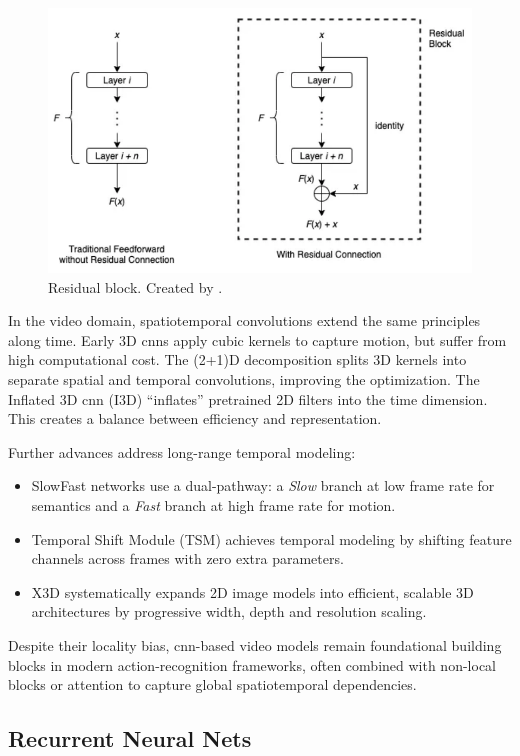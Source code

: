 \begin{figure}
    \centering
    \includegraphics[width=0.5\linewidth]{figures/res_connection.png} 
    \caption{Residual block. Created by \textcite{wong_what_is_residual_2022}. }
    \label{fig:res_connection}
\end{figure}

In the video domain, spatiotemporal convolutions extend the same principles along time.  Early 3D \acrshort{cnn}s \cite{tran_learning_2015} apply cubic kernels to capture motion, but suffer from high computational cost.  The (2+1)D decomposition \cite{tran_2_plus_1_convolution} splits 3D kernels into separate spatial and temporal convolutions, improving the optimization.  The Inflated 3D \acrshort{cnn} (I3D) \cite{carreira_2017_i3d_quo_vadis} “inflates” pretrained 2D filters into the time dimension. This creates a balance between efficiency and representation.

Further advances address long-range temporal modeling:
\begin{itemize}
    \item SlowFast networks \cite{feichtenhofer_slowfast_2019} use a dual-pathway: a \emph{Slow} branch at low frame rate for semantics and a \emph{Fast} branch at high frame rate for motion.  
    \item Temporal Shift Module (TSM) \cite{lin_temporal_shift_2019} achieves temporal modeling by shifting feature channels across frames with zero extra parameters.  
    \item X3D \cite{feichtenhofer_x3d_2020} systematically expands 2D image models into efficient, scalable 3D architectures by progressive width, depth and resolution scaling.
\end{itemize}

Despite their locality bias, \acrshort{cnn}-based video models remain foundational building blocks in modern action-recognition frameworks, often combined with non-local blocks or attention to capture global spatiotemporal dependencies.


\subsection{Recurrent Neural Nets}

